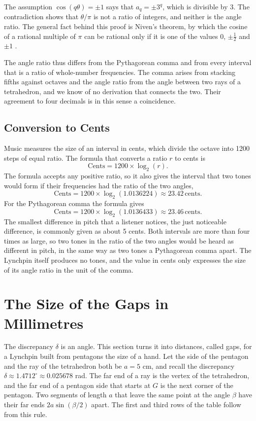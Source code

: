 \documentclass[a4paper,12pt]{article}
\begin{document}
The assumption \( \cos(q\theta) = \pm 1 \) says that \( a_q = \pm 3^q \), which is divisible by 3. The contradiction shows that \( \theta/\pi \) is not a ratio of integers, and neither is the angle ratio. The general fact behind this proof is Niven's theorem, by which the cosine of a rational multiple of \( \pi \) can be rational only if it is one of the values \( 0 \), \( \pm\frac{1}{2} \) and \( \pm 1 \) \cite{niven}.

The angle ratio thus differs from the Pythagorean comma and from every interval that is a ratio of whole-number frequencies. The comma arises from stacking fifths against octaves and the angle ratio from the angle between two rays of a tetrahedron, and we know of no derivation that connects the two. Their agreement to four decimals is in this sense a coincidence.

\subsection{Conversion to Cents}
Music measures the size of an interval in cents, which divide the octave into 1200 steps of equal ratio. The formula that converts a ratio \( r \) to cents is
\[
\text{Cents} = 1200 \times \log_2(r) .
\]
The formula accepts any positive ratio, so it also gives the interval that two tones would form if their frequencies had the ratio of the two angles,
\[
\text{Cents} = 1200 \times \log_2(1.0136224) \approx 23.42 \, \text{cents} .
\]
For the Pythagorean comma the formula gives
\[
\text{Cents} = 1200 \times \log_2(1.0136433) \approx 23.46 \, \text{cents} .
\]
The smallest difference in pitch that a listener notices, the just noticeable difference, is commonly given as about 5 cents. Both intervals are more than four times as large, so two tones in the ratio of the two angles would be heard as different in pitch, in the same way as two tones a Pythagorean comma apart. The Lynchpin itself produces no tones, and the value in cents only expresses the size of its angle ratio in the unit of the comma.


\section{The Size of the Gaps in Millimetres}
\label{sec:size}
The discrepancy \( \delta \) is an angle. This section turns it into distances, called gaps, for a Lynchpin built from pentagons the size of a hand. Let the side of the pentagon and the ray of the tetrahedron both be \( a = 5 \) cm, and recall the discrepancy \( \delta \approx 1.4712^\circ \approx 0.025678 \) rad. The far end of a ray is the vertex of the tetrahedron, and the far end of a pentagon side that starts at \( G \) is the next corner of the pentagon. Two segments of length \( a \) that leave the same point at the angle \( \beta \) have their far ends \( 2a\sin(\beta/2) \) apart. The first and third rows of the table follow from this rule.
\end{document}
